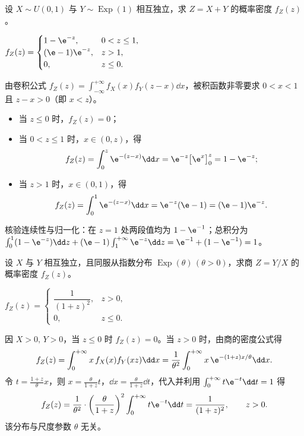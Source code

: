 \begin{exercise}
设 $X\sim U(0,1)$ 与 $Y\sim\operatorname{Exp}(1)$ 相互独立，求 $Z=X+Y$ 的概率密度 $f_Z(z)$。
\begin{answer}
$f_Z(z)=\begin{cases} 1-\e^{-z},& 0<z\le 1,\\ (\e-1)\e^{-z},& z>1,\\ 0,& z\le 0. \end{cases}$
\end{answer}
\begin{solution}
由卷积公式 $f_Z(z)=\int_{-\infty}^{+\infty}f_X(x)f_Y(z-x)\dd x$，被积函数非零要求 $0<x<1$ 且 $z-x>0$（即 $x<z$）。
\begin{itemize}
  \item 当 $z\le 0$ 时，$f_Z(z)=0$；
  \item 当 $0<z\le 1$ 时，$x\in(0,z)$，得
  \[
    f_Z(z)=\int_{0}^{z}\e^{-(z-x)}\dd x=\e^{-z}\bigl[\e^x\bigr]_{0}^{z}=1-\e^{-z};
  \]
  \item 当 $z>1$ 时，$x\in(0,1)$，得
  \[
    f_Z(z)=\int_{0}^{1}\e^{-(z-x)}\dd x=\e^{-z}(\e-1)=(\e-1)\e^{-z}.
  \]
\end{itemize}
核验连续性与归一化：在 $z=1$ 处两段值均为 $1-\e^{-1}$；总积分为 $\int_{0}^{1}(1-\e^{-z})\dd z+(\e-1)\int_{1}^{+\infty}\e^{-z}\dd z=\e^{-1}+(1-\e^{-1})=1$。
\end{solution}
\end{exercise}

\begin{exercise}
设 $X$ 与 $Y$ 相互独立，且同服从指数分布 $\operatorname{Exp}(\theta)\,(\theta>0)$，求商 $Z=Y/X$ 的概率密度 $f_Z(z)$。
\begin{answer}
$f_Z(z)=\begin{cases} \dfrac{1}{(1+z)^2},& z>0,\\ 0,& z\le 0. \end{cases}$
\end{answer}
\begin{solution}
因 $X>0,\,Y>0$，当 $z\le 0$ 时 $f_Z(z)=0$。当 $z>0$ 时，由商的密度公式得
\[
  f_Z(z)=\int_{0}^{+\infty}x\,f_X(x)f_Y(xz)\dd x
  =\frac{1}{\theta^2}\int_{0}^{+\infty}x\,\e^{-(1+z)x/\theta}\dd x.
\]
令 $t=\frac{1+z}{\theta}x$，则 $x=\frac{\theta}{1+z}t$，$\dd x=\frac{\theta}{1+z}\dd t$，代入并利用 $\int_{0}^{+\infty}t\e^{-t}\dd t=1$ 得
\[
  f_Z(z)=\frac{1}{\theta^2}\cdot\left(\frac{\theta}{1+z}\right)^2\int_{0}^{+\infty}t\e^{-t}\dd t
  =\frac{1}{(1+z)^2},\qquad z>0.
\]
该分布与尺度参数 $\theta$ 无关。
\end{solution}
\end{exercise}

